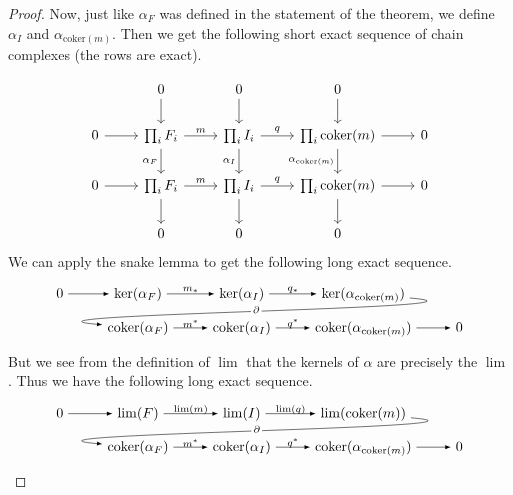 \documentclass[12pt, notitlepage]{article}
\theoremstyle{definition}
\newcommand{\coker}{\mathrm{coker}}
\begin{document}
\begin{proof}
Now, just like $\alpha_F$ was defined in the statement of the theorem, we define $\alpha_I$ and
$\alpha_{\coker(m)}$.  Then we get the following short exact sequence of chain complexes (the rows
are exact).

\[
  \begin{tikzcd}
    & 0 \ar[d] & 0 \ar[d] & 0 \ar[d] & \\
    0 \ar[r] & \prod_{i} F_i \ar[r, "m"] \ar[d, swap, "\alpha_F"] & \prod_{i} I_i \ar[r, "q"] \ar[d, swap, "\alpha_I"] & \prod_{i} \coker(m) \ar[r] \ar[d, swap, "\alpha_{\coker(m)}"] & 0 \\
    0 \ar[r] & \prod_{i} F_i \ar[r, "m"] \ar[d] & \prod_{i} I_i \ar[r, "q"] \ar[d] & \prod_{i} \coker(m) \ar[r] \ar[d] & 0 \\
    & 0 & 0 & 0 &
  \end{tikzcd}
\]
We can apply the snake lemma to get the following long exact sequence.
\[
  \begin{tikzpicture}[descr/.style={fill=white,inner sep=1.5pt}]
    \matrix (m) [ matrix of math nodes, row sep=1em, column sep=2.5em, text height=1.5ex, text
    depth=0.25ex ]
    { 0 & \ker(\alpha_F) & \ker(\alpha_I) & \ker(\alpha_{\coker(m)}) & \\
      & \coker(\alpha_F) & \coker(\alpha_I) & \coker(\alpha_{\coker(m)}) & 0 \\
    };

    \path[overlay,->, font=\scriptsize,>=latex] (m-1-1) edge (m-1-2) (m-1-2) edge
    node[yshift=0.7ex]{$m_{\ast}$} (m-1-3) (m-1-3) edge
    node[yshift=0.7ex]{$q_{\ast}$} (m-1-4) (m-1-4) edge[out=355,in=175] node[descr,yshift=0.3ex]
    {$\partial$} (m-2-2) (m-2-2) edge
    node[yshift=0.7ex]{$m^{\ast}$} (m-2-3) (m-2-3) edge
    node[yshift=0.7ex]{$q^{\ast}$} (m-2-4) (m-2-4) edge (m-2-5);
  \end{tikzpicture}
\]
But we see from the definition of $\lim$ that the kernels of $\alpha$ are precisely the $\lim$. Thus
we have the following long exact sequence.
\[
  \begin{tikzpicture}[descr/.style={fill=white,inner sep=1.5pt}]
    \matrix (m) [ matrix of math nodes, row sep=1em, column sep=2.5em, text height=1.5ex, text
    depth=0.25ex ]
    { 0 & \lim(F) & \lim(I) & \lim(\coker(m)) & \\
      & \coker(\alpha_F) & \coker(\alpha_I) & \coker(\alpha_{\coker(m)}) & 0 \\
    };

    \path[overlay,->, font=\scriptsize,>=latex] (m-1-1) edge (m-1-2) (m-1-2) edge
    node[yshift=0.7ex]{$\lim(m)$} (m-1-3) (m-1-3) edge
    node[yshift=0.7ex]{$\lim(q)$} (m-1-4) (m-1-4) edge[out=355,in=175] node[descr,yshift=0.3ex]
    {$\partial$} (m-2-2) (m-2-2) edge
    node[yshift=0.7ex]{$m^{\ast}$} (m-2-3) (m-2-3) edge
    node[yshift=0.7ex]{$q^{\ast}$} (m-2-4) (m-2-4) edge (m-2-5);
  \end{tikzpicture}
\]


\end{proof}
\end{document}
